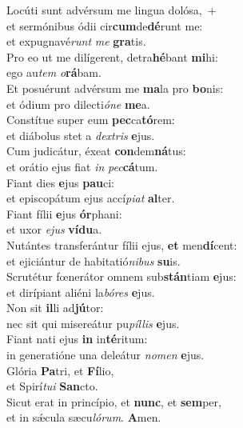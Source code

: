 \evenverse Locúti sunt advérsum me lingua dolósa,~+\\\evenverse  et sermónibus ódii cir\textbf{cum}de\textbf{dé}runt me:~\*\\
\evenverse et expugnavé\textit{runt} \textit{me} \textbf{gra}tis.\\
\oddverse Pro eo ut me dilígerent, detra\textbf{hé}bant \textbf{mi}hi:~\*\\
\oddverse ego au\textit{tem} \textit{o}\textbf{rá}bam.\\
\evenverse Et posuérunt advérsum me \textbf{ma}la pro \textbf{bo}nis:~\*\\
\evenverse et ódium pro dilecti\textit{ó}\textit{ne} \textbf{me}a.\\
\oddverse Constítue super eum \textbf{pec}ca\textbf{tó}rem:~\*\\
\oddverse et diábolus stet a \textit{dex}\textit{tris} \textbf{e}jus.\\
\evenverse Cum judicátur, éxeat \textbf{con}dem\textbf{ná}tus:~\*\\
\evenverse et orátio ejus fiat \textit{in} \textit{pec}\textbf{cá}tum.\\
\oddverse Fiant dies \textbf{e}jus \textbf{pau}ci:~\*\\
\oddverse et episcopátum ejus accí\textit{pi}\textit{at} \textbf{al}ter.\\
\evenverse Fiant fílii \textbf{e}jus \textbf{ór}phani:~\*\\
\evenverse et uxor \textit{e}\textit{jus} \textbf{ví}\textbf{du}a.\\
\oddverse Nutántes transferántur fílii ejus, \textbf{et} men\textbf{dí}cent:~\*\\
\oddverse et ejiciántur de habitatió\textit{ni}\textit{bus} \textbf{su}is.\\
\evenverse Scrutétur fœnerátor omnem sub\textbf{stán}tiam \textbf{e}jus:~\*\\
\evenverse et dirípiant aliéni la\textit{bó}\textit{res} \textbf{e}jus.\\
\oddverse Non sit \textbf{il}li ad\textbf{jú}tor:~\*\\
\oddverse nec sit qui misereátur pu\textit{píl}\textit{lis} \textbf{e}jus.\\
\evenverse Fiant nati ejus \textbf{in} in\textbf{té}ritum:~\*\\
\evenverse in generatióne una deleátur \textit{no}\textit{men} \textbf{e}jus.\\
\oddverse Glória \textbf{Pa}tri, et \textbf{Fí}lio,~\*\\
\oddverse et Spirí\textit{tu}\textit{i} \textbf{San}cto.\\
\evenverse Sicut erat in princípio, et \textbf{nunc}, et \textbf{sem}per,~\*\\
\evenverse et in sǽcula sæcu\textit{ló}\textit{rum}. \textbf{A}men.\\
